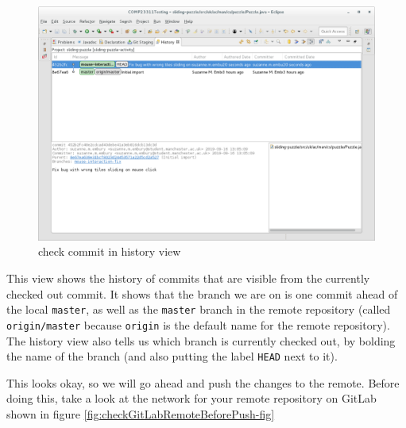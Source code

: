 \documentclass[
]{book}
\begin{document}
\begin{figure}

{\centering \includegraphics[width=1\linewidth]{images/checkCommitInHistoryView} 

}

\caption{check commit in history view}\label{fig:checkCommitInHistoryView-fig}
\end{figure}

This view shows the history of commits that are visible from the currently checked out commit. It shows that the branch we are on is one commit ahead of the local \texttt{master}, as well as the \texttt{master} branch in the remote repository (called \texttt{origin/master} because \texttt{origin} is the default name for the remote repository). The history view also tells us which branch is currently checked out, by bolding the name of the branch (and also putting the label \texttt{HEAD} next to it).

This looks okay, so we will go ahead and push the changes to the remote. Before doing this, take a look at the network for your remote repository on GitLab shown in figure \ref{fig:checkGitLabRemoteBeforePush-fig}
\end{document}

